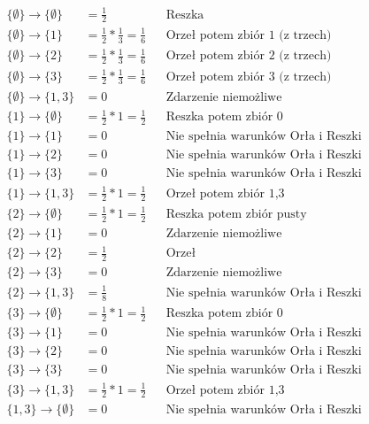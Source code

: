 \documentclass[a4paper,12pt]{article}
\theoremstyle{definition}%
\theoremstyle{definition}
\theoremstyle{problem}
\begin{document}
\begin{enumerate}[label=\alph*)]
\begin{enumerate}
\begin{align*}
\{\emptyset\}\rightarrow \{\emptyset\} &= \frac{1}{2} &&\text{Reszka}\\
\{\emptyset\}\rightarrow \{1\} &= \frac{1}{2}*\frac{1}{3}=\frac{1}{6} &&\text{Orzeł potem zbiór 1 (z trzech)}\\
\{\emptyset\}\rightarrow \{2\} &= \frac{1}{2}*\frac{1}{3}=\frac{1}{6}&&\text{Orzeł potem zbiór 2 (z trzech)}\\
\{\emptyset\}\rightarrow \{3\} &= \frac{1}{2}*\frac{1}{3}=\frac{1}{6}&&\text{Orzeł potem zbiór 3 (z trzech)}\\
\{\emptyset\}\rightarrow \{1,3\} &= 0 &&\text{Zdarzenie niemożliwe}\\
\{1\}\rightarrow \{\emptyset\} &= \frac{1}{2}*1=\frac{1}{2} &&\text{Reszka potem zbiór 0 }\\
\{1\}\rightarrow \{1\} &=0 &&\text{Nie spełnia warunków Orła i Reszki}\\
\{1\}\rightarrow \{2\} &=0 &&\text{Nie spełnia warunków Orła i Reszki}\\
\{1\}\rightarrow \{3\} &=0 &&\text{Nie spełnia warunków Orła i Reszki}\\
\{1\}\rightarrow \{1,3\} &= \frac{1}{2}*1=\frac{1}{2}&&\text{Orzeł potem zbiór 1,3}\\
\{2\}\rightarrow \{\emptyset\} &=\frac{1}{2}*1=\frac{1}{2} &&\text{Reszka potem zbiór pusty}\\
\{2\}\rightarrow \{1\} &=0 &&\text{Zdarzenie niemożliwe}\\
\{2\}\rightarrow \{2\} &=\frac{1}{2} &&\text{Orzeł}\\
\{2\}\rightarrow \{3\} &=0 &&\text{Zdarzenie niemożliwe}\\
\{2\}\rightarrow \{1,3\} &=\frac{1}{8} &&\text{Nie spełnia warunków Orła i Reszki}\\
\{3\}\rightarrow \{\emptyset\} &=\frac{1}{2}*1=\frac{1}{2} &&\text{Reszka potem zbiór 0}\\
\{3\}\rightarrow \{1\} &=0 &&\text{Nie spełnia warunków Orła i Reszki}\\
\{3\}\rightarrow \{2\} &=0 &&\text{Nie spełnia warunków Orła i Reszki}\\
\{3\}\rightarrow \{3\} &=0 &&\text{Nie spełnia warunków Orła i Reszki}\\
\{3\}\rightarrow \{1,3\} &=\frac{1}{2}*1=\frac{1}{2} &&\text{Orzeł potem zbiór 1,3}\\
\{1,3\}\rightarrow \{\emptyset\} &=0 &&\text{Nie spełnia warunków Orła i Reszki}\\

\end{align*}
\end{enumerate}
\end{enumerate}
\end{document}
